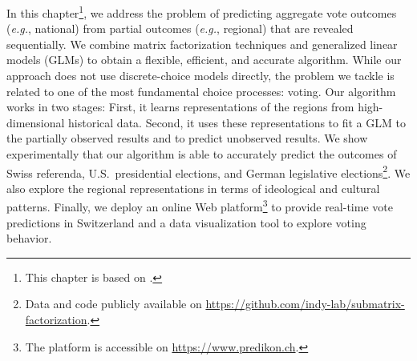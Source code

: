 
In this chapter\footnote{This chapter is based on \citet{immer2020sub}.}, we address the problem of predicting aggregate vote outcomes (\textit{e.g.}, national) from partial outcomes (\textit{e.g.}, regional) that are revealed sequentially.
We combine matrix factorization techniques and generalized linear models (GLMs) to obtain a flexible, efficient, and accurate algorithm.
While our approach does not use discrete-choice models directly, the problem we tackle is related to one of the most fundamental choice processes: voting.
Our algorithm works in two stages:
First, it learns representations of the regions from high-dimensional historical data.
Second, it uses these representations to fit a GLM to the partially observed results and to predict unobserved results.
We show experimentally that our algorithm is able to accurately predict the outcomes of Swiss referenda, U.S.\ presidential elections, and German legislative elections\footnote{Data and code publicly available on \href{https://github.com/indy-lab/submatrix-factorization}{https://github.com/indy-lab/submatrix-factorization}.}.
We also explore the regional representations in terms of ideological and cultural patterns.
Finally, we deploy an online Web platform\footnote{The platform is accessible on \href{https://www.predikon.ch}{https://www.predikon.ch}.} to provide real-time vote predictions in Switzerland and a data visualization tool to explore voting behavior.

